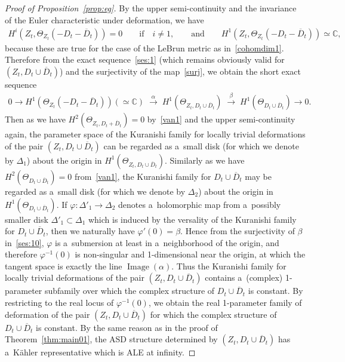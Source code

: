 \documentclass[pdftex]{sigma}
\numberwithin{equation}{section}
\DeclareMathOperator{\Image}{Image}
\begin{document}
\begin{proof}[Proof of Proposition~\ref{prop:eg}]
By the upper semi-continuity and the invariance of the Euler characteristic under deformation, we have
\begin{gather*}%
H^i(Z_t,\Theta_{Z_t}(-D_t-\overline D_t)) =0
\qquad
\text{if}
\quad
i\neq 1,
\qquad
\text{and}
\qquad
H^1(Z_t,\Theta_{Z_t}(-D_t-\overline D_t)) \simeq\mathbb{C},
\end{gather*}
because these are true for the case of the LeBrun metric as in~\eqref{cohomdim1}.
Therefore from the exact sequence~\eqref{ses:1} (which remains obviously valid for $(Z_t,D_t\cup\overline D_t)$) and the
surjectivity of the map~\eqref{surj}, we obtain the short exact sequence
\begin{gather}
\label{ses:10}
0
\longrightarrow
H^1(\Theta_{Z_t}(-D_t-\overline D_t))
(\simeq\mathbb{C})
\;\stackrel{\alpha}{\longrightarrow}
\;
H^1(\Theta_{Z_t, D_t\cup\overline D_t})
\;\stackrel{\beta}{\longrightarrow}
\;
H^1(\Theta_{D_t\cup \overline D_t})
\longrightarrow
0.
\end{gather}
Then as we have $H^2(\Theta_{Z_t,D_t+\overline D_t}) = 0$ by~\eqref{van1} and the upper semi-continuity again, the
parameter space of the Kuranishi family for locally trivial deformations of the pair $(Z_t,D_t\cup\overline D_t)$ can be
regarded as a~small disk (for which we denote by $\Delta_1$) about the origin in $H^1(\Theta_{Z_t,D_t\cup\overline
D_t})$.
Similarly as we have $H^2(\Theta_{D_t\cup\overline D_t})=0$ from~\eqref{van1}, the Kuranishi family for $D_t\cup
\overline D_t$ may be regarded as a~small disk (for which we denote by $\Delta_2$) about the origin in
$H^1(\Theta_{D_t\cup\overline D_t})$.
If $\varphi:\Delta'_1\to\Delta_2$ denotes a~holomorphic map from a~possibly smaller disk $\Delta'_1\subset\Delta_1$
which is induced by the versality of the Kuranishi family for $D_t\cup\overline D_t$, then we naturally have
$\varphi'(0) = \beta$.
Hence from the surjectivity of $\beta$ in~\eqref{ses:10}, $\varphi$ is a~submersion at least in a~neighborhood of the
origin, and therefore $\varphi^{-1}(0)$ is non-singular and 1-dimensional near the origin, at which the tangent space is
exactly the line $\Image(\alpha)$.
Thus the Kuranishi family for locally trivial deformations of the pair $(Z_t,D_t\cup \overline D_t)$ contains
a~(complex) 1-parameter subfamily over which the complex structure of $D_t\cup\overline D_t$ is constant.
By restricting to the real locus of $\varphi^{-1}(0)$, we obtain the real 1-parameter family of deformation of the pair
$(Z_t,D_t\cup \overline D_t)$ for which the complex structure of $D_t\cup\overline D_t$ is constant.
By the same reason as in the proof of Theorem~\ref{thm:main01}, the ASD structure determined by $(Z_t,D_t\cup\overline
D_t)$ has a~K\"ahler representative which is ALE at inf\/inity.


\end{proof}
\end{document}
